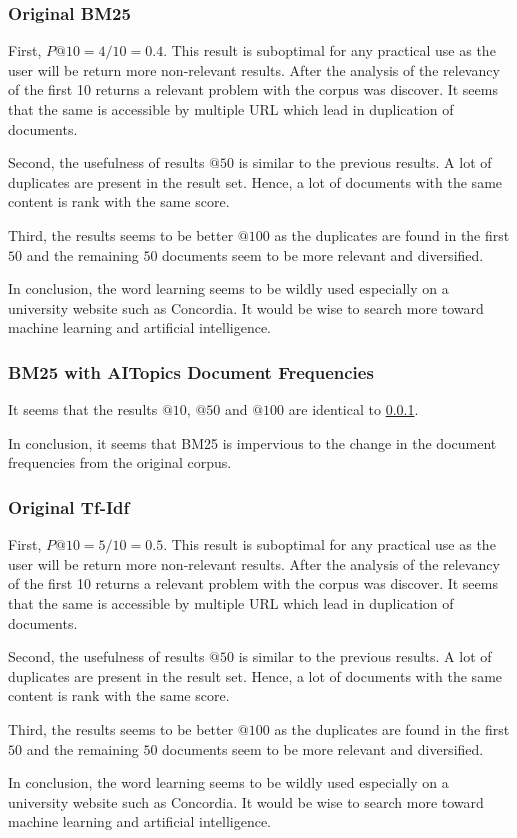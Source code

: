 \subsubsection{Original BM25}\label{query-1-bm-25}

\par First, $P@10=4/10=0.4$. This result is suboptimal for any practical use as the user will be return more non-relevant results. After the analysis of the relevancy of the first 10 returns a relevant problem with the corpus was discover. It seems that the same is accessible by multiple URL which lead in duplication of documents.
\par Second, the usefulness of results $@50$ is similar to the previous results. A lot of duplicates are present in the result set. Hence, a lot of documents with the same content is rank with the same score.
\par Third, the results seems to be better $@100$ as the duplicates are found in the first $50$ and the remaining $50$ documents seem to be more relevant and diversified.
\par In conclusion, the word learning seems to be wildly used especially on a university website such as Concordia. It would be wise to search more toward machine learning and artificial intelligence.

\subsubsection{BM25 with AITopics Document Frequencies}\label{query-1-bm-25-aitopics}

\par It seems that the results $@10$, $@50$ and $@100$ are identical to \ref{query-1-bm-25}.
\par In conclusion, it seems that BM25 is impervious to the change in the document frequencies from the original corpus.

\subsubsection{Original Tf-Idf}\label{query-1-tf-idf}

\par First, $P@10=5/10=0.5$. This result is suboptimal for any practical use as the user will be return more non-relevant results. After the analysis of the relevancy of the first 10 returns a relevant problem with the corpus was discover. It seems that the same is accessible by multiple URL which lead in duplication of documents.
\par Second, the usefulness of results $@50$ is similar to the previous results. A lot of duplicates are present in the result set. Hence, a lot of documents with the same content is rank with the same score.
\par Third, the results seems to be better $@100$ as the duplicates are found in the first $50$ and the remaining $50$ documents seem to be more relevant and diversified.
\par In conclusion, the word learning seems to be wildly used especially on a university website such as Concordia. It would be wise to search more toward machine learning and artificial intelligence.

